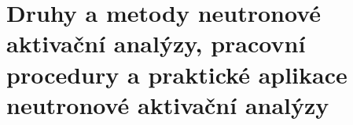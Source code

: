 \section[Aktivační analýza]{Druhy a metody neutronové aktivační analýzy, pracovní procedury a praktické aplikace neutronové aktivační analýzy}


